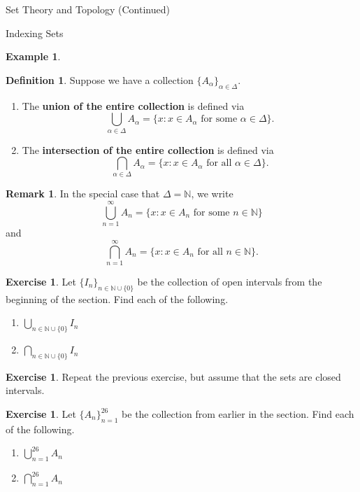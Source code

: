 \documentclass[11pt]{article}
\theoremstyle{definition}
\newtheorem{definition}[theorem]{Definition}
\newtheorem{example}[theorem]{Example}
\newtheorem{exercise}[theorem]{Exercise}
\newtheorem{remark}[theorem]{Remark}
\begin{document}
\begin{section}{Set Theory and Topology (Continued)}
\begin{subsection}{Indexing Sets}
\begin{example}
\begin{enumerate}
\end{enumerate}
\end{example}

\begin{definition}
Suppose we have a collection $\{A_{\alpha}\}_{\alpha\in\Delta}$.

\begin{enumerate}
\item The \textbf{union of the entire collection} is defined via
\[
\bigcup_{\alpha\in\Delta} A_{\alpha}=\{x:x\in A_{\alpha} \mbox{ for some }\alpha\in \Delta\}.
\]

\item The \textbf{intersection of the entire collection} is defined via
\[
\bigcap_{\alpha\in\Delta} A_{\alpha}=\{x:x\in A_{\alpha} \mbox{ for all }\alpha\in \Delta\}.
\]

\end{enumerate}
\end{definition}

\begin{remark} 
In the special case that $\Delta=\mathbb{N}$, we write
\[
\bigcup_{n=1}^{\infty}A_n= \{ x : x \in A_n \mbox{ for some } n \in \mathbb{N}\}
\] 
and
\[
\bigcap_{n=1}^{\infty}A_n= \{ x : x \in A_n \mbox{ for all } n \in \mathbb{N}\}.
\] 
\end{remark}

\begin{exercise}
Let $\{I_n\}_{n\in\mathbb{N}\cup\{0\}}$ be the collection of open intervals from the beginning of the section.  Find each of the following.
\begin{enumerate}
\item $\displaystyle \bigcup_{n\in\mathbb{N}\cup\{0\}}I_n$
\item $\displaystyle \bigcap_{n\in\mathbb{N}\cup\{0\}}I_n$
\end{enumerate}
\end{exercise}

\begin{exercise}
Repeat the previous exercise, but assume that the sets are closed intervals.
\end{exercise}

\begin{exercise}
Let $\{A_n\}_{n=1}^{26}$ be the collection from earlier in the section.  Find each of the following.
\begin{enumerate}
\item $\displaystyle \bigcup_{n=1}^{26}A_n$
\item $\displaystyle \bigcap_{n=1}^{26}A_n$
\end{enumerate}
\end{exercise}


\end{subsection}
\end{section}
\end{document}
